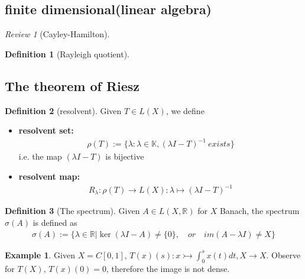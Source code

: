 \documentclass[a4paper,11pt,fleqn]{book}
\theoremstyle{definition}
\newtheorem{definition}{Definition}[section]
\newtheorem*{example}{Example}
\theoremstyle{remark}
\newtheorem{review}{Review}
\begin{document}
\subsection{finite dimensional(linear algebra)}
\begin{review}[Cayley-Hamilton]
\end{review}

\begin{definition}[Rayleigh quotient]
\end{definition}


\subsection{The theorem of Riesz}
\begin{definition}[resolvent]
Given $T \in L(X)$, we define
\begin{itemize}
	\item \textbf{resolvent set:}
	\begin{align*}
		\rho(T):= \{\lambda: \lambda\in \mathbb{K}, (\lambda I - T)^{-1}\ exists\}
	\end{align*}
	i.e. the map $(\lambda I - T)$ is bijective
	\item \textbf{resolvent map:}
	\begin{align*}
		R_\lambda: \rho(T) \rightarrow L(X): \lambda \mapsto (\lambda I - T)^{-1}
	\end{align*}
\end{itemize}
	
\end{definition}
\begin{definition}[The spectrum]
	Given $A \in L(X, \mathbb{R})$ for $X$ Banach, the spectrum $\sigma(A)$ is defined as
	\begin{align*}
		\sigma(A):=  \bigg\{ \lambda \in \mathbb{R}\bigg| \ker(\lambda I - A) \neq \{0\}, \quad or \quad im(A - \lambda I) \neq X\bigg\}
	\end{align*} 
\end{definition}

\begin{example}
Given $X = C[0, 1]$, $T(x)(s): x \rightarrowtail \int_0^s x(t)dt, X \rightarrow X$. Observe for $T(X)$, $T(x)(0) = 0$, therefore the image is not dense.
\end{example}
\end{document}
